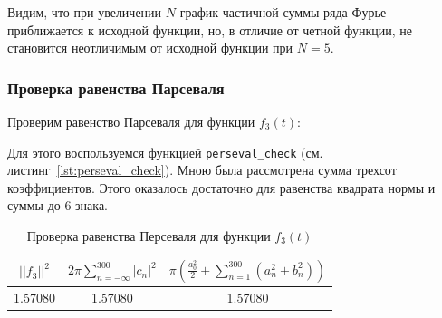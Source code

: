 Видим, что при увеличении $N$ график частичной суммы ряда Фурье приближается к исходной функции, но, в отличие от четной функции, не становится неотличимым от исходной функции при $N = 5$.

\FloatBarrier
\subsubsection{Проверка равенства Парсеваля}

Проверим равенство Парсеваля для функции $f_3(t)$:

Для этого воспользуемся функцией \texttt{perseval\_check} (см. листинг~\ref{lst:perseval_check}).
Мною была рассмотрена сумма трехсот коэффициентов. Этого оказалось достаточно для равенства квадрата нормы и суммы до 6 знака. 

\begin{table}[ht!]
    \centering
    \begin{tabular}{|c|c|c|}
        \hline
        $||f_3||^2$ & $2\pi \sum\limits_{n = -\infty}^{300} |c_n|^2$ & $\pi \left(\frac{a_0^2}{2} + \sum\limits_{n = 1}^{300} (a_n^2 + b_n^2)\right)$\\
        \hline
        1.57080 & 1.57080 & 1.57080 \\
        \hline
    \end{tabular}
    \caption{Проверка равенства Персеваля для функции $f_3(t)$}
    \label{tab:func_3_pers}
\end{table}